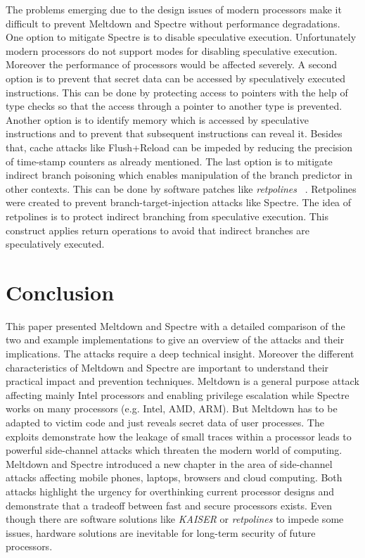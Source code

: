 \documentclass[a4paper,oneside,openright] {scrreprt}
\begin{document}
The problems emerging due to the design issues of modern processors make it difficult to prevent Meltdown and Spectre 
 without performance degradations.
One option to mitigate Spectre is to disable speculative execution. 
Unfortunately modern processors do not support modes for disabling speculative execution. 
Moreover the performance of processors would be affected severely.
A second option is to prevent that secret data can be accessed by speculatively executed instructions. 
This can be done by protecting access to pointers with the help of type checks 
so that the access through a pointer to another type is prevented.
Another option is to identify memory which is accessed by speculative instructions and to prevent that subsequent
instructions can reveal it.
Besides that, cache attacks like Flush+Reload can be impeded by reducing the precision of time-stamp counters as already mentioned.
The last option is to mitigate indirect branch poisoning which enables manipulation of the branch predictor in other contexts.
This can be done by software patches like \textit{retpolines} ~\cite{retpoline}.
Retpolines were created to prevent branch-target-injection attacks like Spectre. 
The idea of retpolines is to protect indirect branching from speculative execution.
This construct applies return operations to avoid that indirect branches are speculatively executed.  

\chapter{Conclusion}
\label{ch:conclusion}

This paper presented Meltdown and Spectre with a detailed comparison of the two and example implementations to give 
an overview of the attacks and their implications.
The attacks require a deep technical insight.
Moreover the different characteristics of Meltdown and Spectre are important to understand their practical impact
and prevention techniques.
Meltdown is a general purpose attack affecting mainly Intel processors and enabling privilege escalation while Spectre 
works on many processors (e.g. Intel, AMD, ARM). But Meltdown has to be adapted to victim code and just reveals secret data of user processes.
The exploits demonstrate how the leakage of small traces within a processor leads to powerful side-channel attacks
which threaten the modern world of computing. 
Meltdown and Spectre introduced a new chapter in the area of side-channel attacks affecting mobile phones, laptops, browsers and
 cloud computing.
Both attacks highlight the urgency for overthinking current processor designs and demonstrate that a tradeoff between
fast and secure processors exists.
Even though there are software solutions like \textit{KAISER} or \textit{retpolines} to impede some issues, 
hardware solutions are inevitable for long-term security of future processors.

\lstlistoflistings



\end{document}
